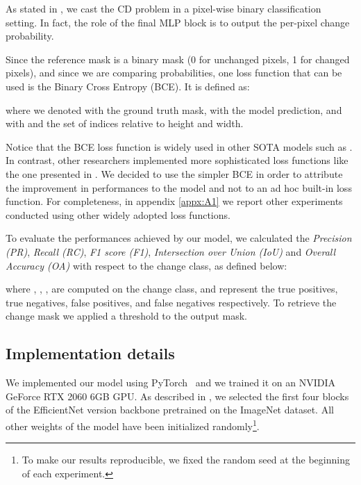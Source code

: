As stated in , we cast the CD problem in a pixel-wise binary classification setting.
In fact, the role of the final MLP block is to output the per-pixel change probability.

Since the reference mask is a binary mask (0 for unchanged pixels, 1 for changed pixels), and since we are comparing 
probabilities, one loss function that can be used is the Binary Cross Entropy (BCE). It is defined as:


where we denoted with  the ground truth mask, with  the model prediction, and with  and  the set of indices relative to height and width.

Notice that the BCE loss function is widely used in other SOTA models such as \cite{bandara2022transformer,chen2021remote}.
In contrast, other researchers implemented more sophisticated loss functions like the one presented in \cite{chen2020spatial}.
We decided to use the simpler BCE in order to attribute the improvement in performances to the model and not to an ad hoc built-in loss function.
For completeness, in appendix \ref{appx:A1} we report other experiments conducted using other widely adopted loss functions.

To evaluate the performances achieved by our model, we calculated the
\emph{Precision (PR)}, \emph{Recall (RC)}, \emph{F1 score (F1)}, \emph{Intersection over Union (IoU)}
and \emph{Overall Accuracy (OA)} with respect to the change class, as defined below:

where , , ,  are computed on the change class, and represent the true positives, true negatives, false positives, and false negatives respectively.
To retrieve the change mask we applied a  threshold to the output mask.

\subsection{Implementation details}

We implemented our model using PyTorch~\cite{paszke2019pytorch} and we trained it on an NVIDIA GeForce RTX 2060 6GB GPU.
As described in , we selected the first four blocks of the EfficientNet version  backbone pretrained on the ImageNet dataset.
All other weights of the model have been initialized randomly\footnote{
    To make our results reproducible, we fixed the random seed at the beginning of each experiment.
}.


